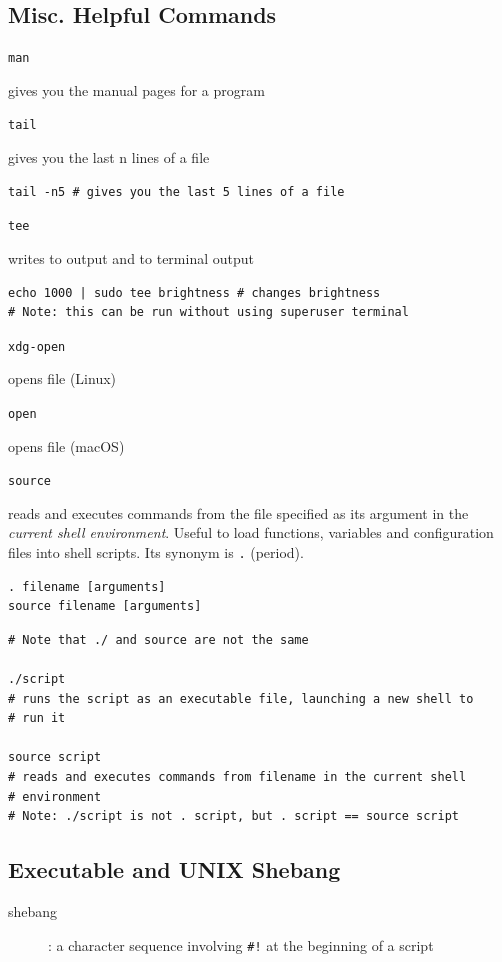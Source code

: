 \documentclass[letterpaper,12pt]{article}
\newcommand*{\lstitem}[1]{
  \setbox0\hbox{\lstinline{#1}}
  \item[\usebox0]
}
\begin{document}
\subsection{Misc. Helpful Commands}

\begin{description}
 \lstitem{man} gives you the manual pages for a program
 \lstitem{tail} gives you the last n lines of a file
\end{description}

\begin{lstlisting}
tail -n5 # gives you the last 5 lines of a file
\end{lstlisting}

\begin{description}
 \lstitem{tee} writes to output and to terminal output
\end{description}

\begin{lstlisting}
echo 1000 | sudo tee brightness # changes brightness
# Note: this can be run without using superuser terminal
\end{lstlisting}

\begin{description}
 \lstitem{xdg-open} opens file (Linux)
 \lstitem{open} opens file (macOS)
\end{description}

\begin{description}
 \lstitem{source} reads and executes commands from the file specified as its argument in the \textit{current shell environment}. Useful to load functions, variables and configuration files into shell scripts. Its synonym is \lstinline{.} (period).
\end{description}

\begin{lstlisting}
. filename [arguments]
source filename [arguments]
\end{lstlisting}

\begin{lstlisting}
# Note that ./ and source are not the same

./script
# runs the script as an executable file, launching a new shell to
# run it

source script
# reads and executes commands from filename in the current shell
# environment
# Note: ./script is not . script, but . script == source script
\end{lstlisting}

\subsection{Executable and UNIX Shebang}
\begin{description}
 \item[shebang]: a character sequence involving \lstinline{#!} at the beginning of a script
\end{description}
\end{document}
